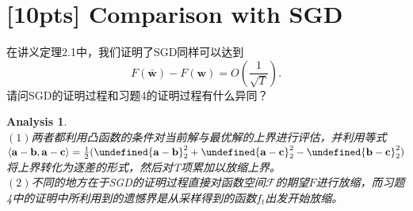 \documentclass[a4paper,UTF8]{article}
\let\norm\undefined %
\DeclarePairedDelimiter\norm{\lVert}{\rVert}
\numberwithin{equation}{section}
\newtheorem*{myAnalysis}{Analysis}
\begin{document}
\section{[10pts] Comparison with SGD}
\noindent 在讲义定理2.1中，我们证明了SGD同样可以达到
\[
F(\bar{\mathbf{w}}) -  F(\mathbf{w}) =O\left( \frac{1}{\sqrt{T}}\right).
\]
请问SGD的证明过程和习题4的证明过程有什么异同？
\begin{myAnalysis}~\\
$(1)$两者都利用凸函数的条件对当前解与最优解的上界进行评估，并利用等式$\langle \mathbf{a} - \mathbf{b}, \mathbf{a} - \mathbf{c} \rangle = \frac{1}{2} ( \norm{\mathbf{a}-\mathbf{b}}_2^2 + \norm{\mathbf{a}-\mathbf{c}}_2^2 - \norm{\mathbf{b}-\mathbf{c}}_2^2 )$将上界转化为逐差的形式，然后对T项累加以放缩上界。
~\\
$(2)$不同的地方在于SGD的证明过程直接对函数空间$\mathcal{F}$的期望$F$进行放缩，而习题4中的证明中所利用到的遗憾界是从采样得到的函数$f_t$出发开始放缩。
	~\\
	~\\	
	~\\
\end{myAnalysis}
\end{document}
